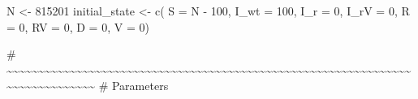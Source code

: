 \documentclass[
  11pt,
  letterpaper,
  DIV=11,
  numbers=noendperiod]{scrartcl}
\newenvironment{Shaded}{\begin{snugshade}}{\end{snugshade}}
\newcommand{\AttributeTok}[1]{\textcolor[rgb]{0.40,0.45,0.13}{#1}}
\newcommand{\CommentTok}[1]{\textcolor[rgb]{0.37,0.37,0.37}{#1}}
\newcommand{\DecValTok}[1]{\textcolor[rgb]{0.68,0.00,0.00}{#1}}
\newcommand{\FunctionTok}[1]{\textcolor[rgb]{0.28,0.35,0.67}{#1}}
\newcommand{\NormalTok}[1]{\textcolor[rgb]{0.00,0.23,0.31}{#1}}
\newcommand{\OtherTok}[1]{\textcolor[rgb]{0.00,0.23,0.31}{#1}}
\newcommand{\SpecialCharTok}[1]{\textcolor[rgb]{0.37,0.37,0.37}{#1}}
\begin{document}
\begin{Shaded}
\begin{Highlighting}[]
\NormalTok{N }\OtherTok{\textless{}{-}} \DecValTok{815201}
\NormalTok{initial\_state }\OtherTok{\textless{}{-}} \FunctionTok{c}\NormalTok{(}
    \AttributeTok{S =}\NormalTok{ N }\SpecialCharTok{{-}} \DecValTok{100}\NormalTok{,}
    \AttributeTok{I\_wt =} \DecValTok{100}\NormalTok{,}
    \AttributeTok{I\_r =} \DecValTok{0}\NormalTok{,}
    \AttributeTok{I\_rV =} \DecValTok{0}\NormalTok{,}
    \AttributeTok{R =} \DecValTok{0}\NormalTok{,}
    \AttributeTok{RV =} \DecValTok{0}\NormalTok{,}
    \AttributeTok{D =} \DecValTok{0}\NormalTok{,}
    \AttributeTok{V =} \DecValTok{0}\NormalTok{)}

\CommentTok{\# \textasciitilde{}\textasciitilde{}\textasciitilde{}\textasciitilde{}\textasciitilde{}\textasciitilde{}\textasciitilde{}\textasciitilde{}\textasciitilde{}\textasciitilde{}\textasciitilde{}\textasciitilde{}\textasciitilde{}\textasciitilde{}\textasciitilde{}\textasciitilde{}\textasciitilde{}\textasciitilde{}\textasciitilde{}\textasciitilde{}\textasciitilde{}\textasciitilde{}\textasciitilde{}\textasciitilde{}\textasciitilde{}\textasciitilde{}\textasciitilde{}\textasciitilde{}\textasciitilde{}\textasciitilde{}\textasciitilde{}\textasciitilde{}\textasciitilde{}\textasciitilde{}\textasciitilde{}\textasciitilde{}\textasciitilde{}\textasciitilde{}\textasciitilde{}\textasciitilde{}\textasciitilde{}\textasciitilde{}\textasciitilde{}\textasciitilde{}\textasciitilde{}\textasciitilde{}\textasciitilde{}\textasciitilde{}\textasciitilde{}\textasciitilde{}\textasciitilde{}\textasciitilde{}\textasciitilde{}\textasciitilde{}\textasciitilde{}\textasciitilde{}\textasciitilde{}\textasciitilde{}\textasciitilde{}\textasciitilde{}\textasciitilde{}\textasciitilde{}\textasciitilde{}\textasciitilde{}\textasciitilde{}\textasciitilde{}\textasciitilde{}\textasciitilde{}\textasciitilde{}\textasciitilde{}\textasciitilde{}\textasciitilde{}\textasciitilde{}\textasciitilde{}\textasciitilde{}\textasciitilde{}\textasciitilde{}\textasciitilde{}}
\CommentTok{\# Parameters}

\end{Highlighting}
\end{Shaded}
\end{document}
